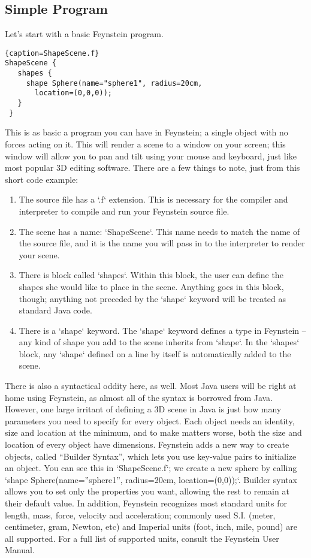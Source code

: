 \subsection{Simple Program}

Let's start with a basic Feynstein program.

\begin{lstlisting}{caption=ShapeScene.f}
ShapeScene {
   shapes {
     shape Sphere(name="sphere1", radius=20cm, 
       location=(0,0,0));
   }
 }
\end{lstlisting}

This is as basic a program you can have in Feynstein; a single object
with no forces acting on it. This will render a scene to a window on
your screen; this window will allow you to pan and tilt using your
mouse and keyboard, just like most popular 3D editing software. There
are a few things to note, just from this short code example:

\begin{enumerate}
\item The source file has a `.f` extension. This is necessary
  for the compiler and interpreter to compile and run your Feynstein
  source file.
\item The scene has a name: `ShapeScene`. This name needs
  to match the name of the source file, and it is the name you will
  pass in to the interpreter to render your scene.
\item There is block called `shapes`. Within this block, the user can
  define the shapes she would like to place in the scene. Anything
  goes in this block, though; anything not preceded by the `shape`
  keyword will be treated as standard Java code.
\item There is a `shape` keyword. The `shape` keyword defines a type
  in Feynstein -- any kind of shape you add to the scene inherits from
  `shape`. In the `shapes` block, any `shape` defined on a line by
  itself is automatically added to the scene.
\end{enumerate}

There is also a syntactical oddity here, as well. Most Java users will
be right at home using Feynstein, as almost all of the syntax is
borrowed from Java. However, one large irritant of defining a 3D scene
in Java is just how many parameters you need to specify for every
object. Each object needs an identity, size and location at the
minimum, and to make matters worse, both the size and location of
every object have dimensions. Feynstein adds a new way to create
objects, called “Builder Syntax”, which lets you use key-value pairs
to initialize an object. You can see this in `ShapeScene.f`; we create
a new sphere by calling `shape Sphere(name=”sphere1”, radius=20cm,
location=(0,0));`. Builder syntax allows you to set only the
properties you want, allowing the rest to remain at their default
value. In addition, Feynstein recognizes most standard units for
length, mass, force, velocity and acceleration; commonly used
S.I. (meter, centimeter, gram, Newton, etc) and Imperial units (foot,
inch, mile, pound) are all supported. For a full list of supported
units, consult the Feynstein User Manual.

